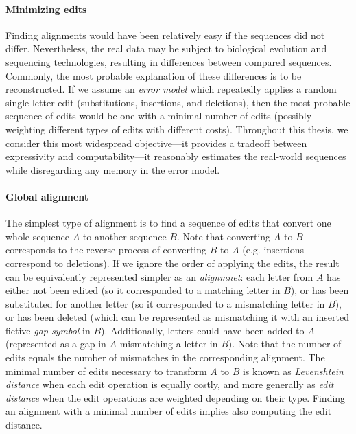 
\paragraph{Minimizing edits}
Finding alignments would have been relatively easy if the sequences did not
differ. Nevertheless, the real data may be subject to biological evolution and
sequencing technologies, resulting in differences between compared sequences.
Commonly, the most probable explanation of these differences is to be
reconstructed. If we assume an \emph{error model} which repeatedly applies a
random single-letter edit (substitutions, insertions, and deletions), then the
most probable sequence of edits would be one with a minimal number of edits
(possibly weighting different types of edits with different costs). Throughout
this thesis, we consider this most widespread objective---it provides a tradeoff
between expressivity and computability---it reasonably estimates the real-world
sequences while disregarding any memory in the error model.

\paragraph{Global alignment}
The simplest type of alignment is to find a sequence of edits that convert one
whole sequence $A$ to another sequence $B$. Note that converting $A$ to $B$
corresponds to the reverse process of converting $B$ to $A$ (e.g. insertions
correspond to deletions). If we ignore the order of applying the edits, the
result can be equivalently represented simpler as an \emph{alignmnet}: each
letter from $A$ has either not been edited (so it corresponded to a matching
letter in $B$), or has been substituted for another letter (so it corresponded
to a mismatching letter in $B$), or has been deleted (which can be represented
as mismatching it with an inserted fictive \emph{gap symbol} in $B$).
Additionally, letters could have been added to $A$ (represented as a gap in $A$
mismatching a letter in $B$). Note that the number of edits equals the number of
mismatches in the corresponding alignment. The minimal number of edits necessary
to transform $A$ to $B$ is known as \emph{Levenshtein distance} when each edit
operation is equally costly, and more generally as \emph{edit distance} when the
edit operations are weighted depending on their type. Finding an alignment with
a minimal number of edits implies also computing the edit distance.

